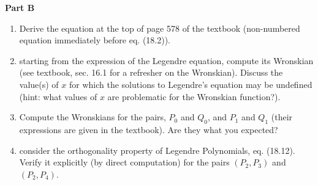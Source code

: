 \documentclass[fleqn]{article}
\begin{document}
  \textbf{Part B}
  \begin{enumerate}
    \item  Derive the equation at the top of page 578 of the textbook (non-numbered equation immediately before eq. (18.2)). 
    
    
    \item  starting from the expression of the Legendre equation, compute its Wronskian (see textbook, sec. 16.1 for a refresher on the Wronskian). Discuss the value(s) of $x$ for which the solutions to Legendre's equation may be undefined (hint: what values of $x$ are problematic for the Wronskian function?).
    
    
    \item  Compute the Wronskians for the pairs, $P_0$ and $Q_0$, and $P_1$ and $Q_1$ (their expressions are given in the textbook). Are they what you expected?
    
    
    \item consider the orthogonality property of Legendre Polynomials, eq. (18.12). Verify it explicitly (by direct computation) for the pairs $(P_2,P_3 )$ and $(P_2,P_4)$. 
    
  \end{enumerate}
\end{document}

